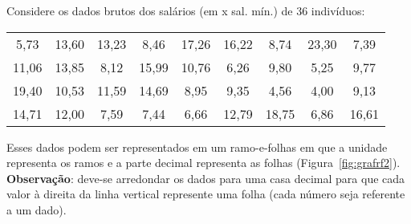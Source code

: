 \documentclass[11pt,fleqn]{book} %
\begin{document}
\begin{example}

	Considere os dados brutos dos salários (em x sal. mín.) de 36 indivíduos:
	
	\begin{center}
	\begin{tabular}{c c c c c c c c c}
	\hline
	5,73  &  13,60  &  13,23  &  8,46  &  17,26  &  16,22  &  8,74  &  23,30  &  7,39 \\
	11,06  &  13,85  &  8,12  &  15,99  &  10,76  &  6,26  &  9,80  &  5,25  &  9,77 \\
	19,40  &  10,53  &  11,59  &  14,69  &  8,95  &  9,35  &  4,56  &  4,00  &  9,13 \\
	14,71  &  12,00  &  7,59  &  7,44  &  6,66  &  12,79  &  18,75  &  6,86  &  16,61 \\
	\hline
	\end{tabular}
	\end{center}
	
	Esses dados podem ser representados em um ramo-e-folhas em que a unidade representa os ramos e a parte decimal representa as folhas (Figura~\ref{fig:grafrf2}). {\bf Observação}: deve-se arredondar os dados para uma casa decimal para que cada valor à direita da linha vertical represente uma folha (cada número seja referente a um dado).



\end{example}
\end{document}
